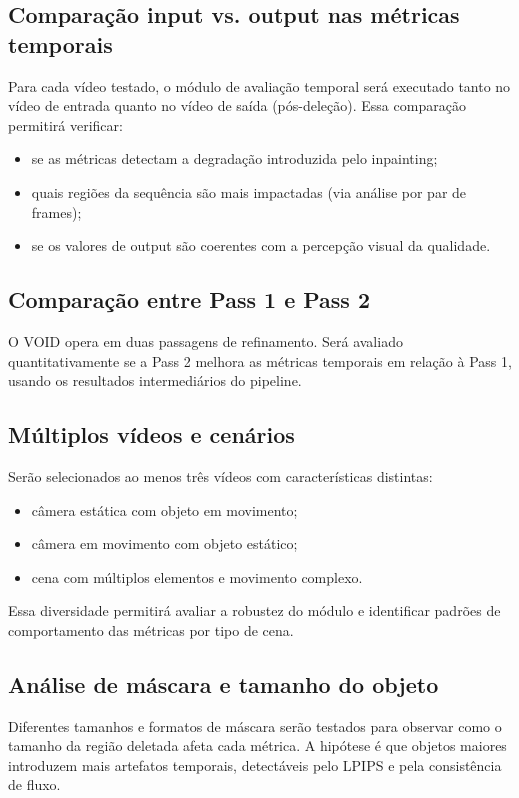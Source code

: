 \documentclass[conference]{IEEEtran}
\begin{document}
\subsection{Comparação input vs. output nas métricas temporais}
Para cada vídeo testado, o módulo de avaliação temporal será executado tanto no vídeo de entrada quanto no vídeo de saída (pós-deleção). Essa comparação permitirá verificar:
\begin{itemize}
    \item se as métricas detectam a degradação introduzida pelo inpainting;
    \item quais regiões da sequência são mais impactadas (via análise por par de frames);
    \item se os valores de output são coerentes com a percepção visual da qualidade.
\end{itemize}

\subsection{Comparação entre Pass 1 e Pass 2}
O VOID opera em duas passagens de refinamento. Será avaliado quantitativamente se a Pass 2 melhora as métricas temporais em relação à Pass 1, usando os resultados intermediários do pipeline.

\subsection{Múltiplos vídeos e cenários}
Serão selecionados ao menos três vídeos com características distintas:
\begin{itemize}
    \item câmera estática com objeto em movimento;
    \item câmera em movimento com objeto estático;
    \item cena com múltiplos elementos e movimento complexo.
\end{itemize}
Essa diversidade permitirá avaliar a robustez do módulo e identificar padrões de comportamento das métricas por tipo de cena.

\subsection{Análise de máscara e tamanho do objeto}
Diferentes tamanhos e formatos de máscara serão testados para observar como o tamanho da região deletada afeta cada métrica. A hipótese é que objetos maiores introduzem mais artefatos temporais, detectáveis pelo LPIPS e pela consistência de fluxo.
\end{document}
